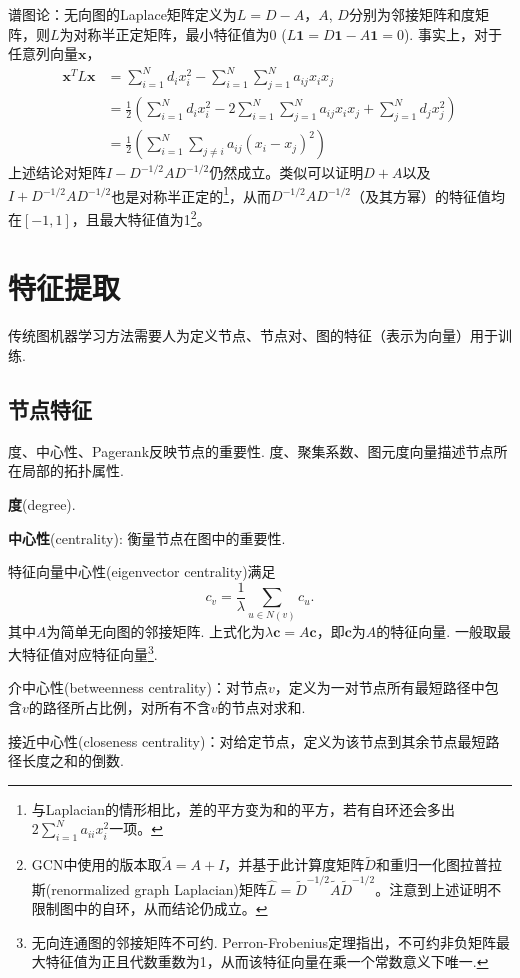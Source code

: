\par 谱图论：无向图的Laplace矩阵定义为$L=D-A$，$A$, $D$分别为邻接矩阵和度矩阵，则$L$为对称半正定矩阵，最小特征值为0 ($L\mathbf{1}=D\mathbf{1}-A\mathbf{1}=0$). 事实上，对于任意列向量$\mathbf{x}$，
\begin{align}
\mathbf{x}^TL\mathbf{x}&=\sum_{i=1}^N d_ix_i^2-\sum_{i=1}^N\sum_{j=1}^N a_{ij}x_ix_j\\
&=\frac{1}{2}\left(\sum_{i=1}^N d_ix_i^2-2\sum_{i=1}^N\sum_{j=1}^N a_{ij}x_ix_j+\sum_{j=1}^N d_jx_j^2\right)\\
&=\frac{1}{2}\left(\sum_{i=1}^N \sum_{j\neq i}a_{ij}(x_i-x_j)^2\right)
\end{align}
上述结论对矩阵$I-D^{-1/2}AD^{-1/2}$仍然成立。类似可以证明$D+A$以及$I+D^{-1/2}AD^{-1/2}$也是对称半正定的\footnote{与Laplacian的情形相比，差的平方变为和的平方，若有自环还会多出$2\sum_{i=1}^N a_{ii}x_i^2$一项。}，从而$D^{-1/2}AD^{-1/2}$（及其方幂）的特征值均在$[-1,1]$，且最大特征值为1\footnote{GCN中使用的版本取$\tilde{A}=A+I$，并基于此计算度矩阵$\tilde{D}$和重归一化图拉普拉斯(renormalized graph Laplacian)矩阵$\hat{L}=\tilde{D}^{-1/2}\tilde{A}\tilde{D}^{-1/2}$。注意到上述证明不限制图中的自环，从而结论仍成立。}。

\section{特征提取}

\par 传统图机器学习方法需要人为定义节点、节点对、图的特征（表示为向量）用于训练. 

\subsection{节点特征}

度、中心性、Pagerank反映节点的重要性. 度、聚集系数、图元度向量描述节点所在局部的拓扑属性. 

\par \textbf{度}(degree).

\par \textbf{中心性}(centrality): 衡量节点在图中的重要性. 
\par 特征向量中心性(eigenvector centrality)满足
\begin{equation}
    c_v=\frac{1}{\lambda}\sum_{u\in N(v)} c_u.
\end{equation}
其中$A$为简单无向图的邻接矩阵. 上式化为$\lambda \mathbf{c}=A\mathbf{c}$，即$\mathbf{c}$为$A$的特征向量. 一般取最大特征值对应特征向量\footnote{无向连通图的邻接矩阵不可约. Perron-Frobenius定理指出，不可约非负矩阵最大特征值为正且代数重数为1，从而该特征向量在乘一个常数意义下唯一. }. 
\par 介中心性(betweenness centrality)：对节点$v$，定义为一对节点所有最短路径中包含$v$的路径所占比例，对所有不含$v$的节点对求和. 
\par 接近中心性(closeness centrality)：对给定节点，定义为该节点到其余节点最短路径长度之和的倒数. 

